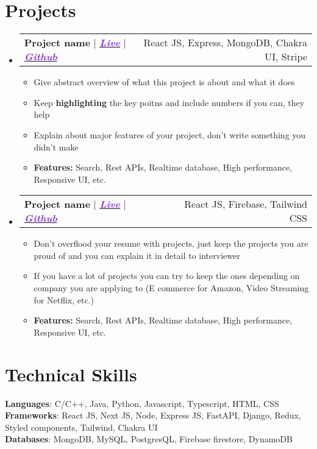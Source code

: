 \documentclass[letterpaper,11pt]{article}
\makeatletter
\newcommand{\resumeItem}[1]{
  \item\small{
    {#1 \vspace{-2pt}}
  }
}
\newcommand{\resumeProjectHeading}[2]{
    \item
    \begin{tabular*}{0.97\textwidth}{l@{\extracolsep{\fill}}r}
      \small#1 & #2 \\
    \end{tabular*}\vspace{-7pt}
}
\newcommand{\resumeSubHeadingListStart}{\begin{itemize}[leftmargin=0.15in, label={}]}
\newcommand{\resumeSubHeadingListEnd}{\end{itemize}}
\newcommand{\resumeItemListStart}{\begin{itemize}}
\newcommand{\resumeItemListEnd}{\end{itemize}\vspace{-5pt}}
\makeatother
\begin{document}
\section{Projects}
    \resumeSubHeadingListStart
      \resumeProjectHeading
          {\textbf{\large{Project name}} $|$ \emph{\href{https://google.com/}{\textcolor{BlueViolet}{\textbf{Live}}}} $|$ \emph{\href{https://github.com/}{\textcolor{BlueViolet}{\textbf{Github}}}}}{React JS, Express, MongoDB, Chakra UI, Stripe}
          \resumeItemListStart
            \resumeItem{Give abstract overview of what this project is about and what it does}
            \resumeItem{Keep \textbf{highlighting} the key poitns and include numbers if you can, they help}
            \resumeItem{Explain about major features of your project, don't write something you didn't make}
            \resumeItem{\textbf{Features:} Search, Rest APIs, Realtime database, High performance, Responsive UI, etc. }
          \resumeItemListEnd
          
    \resumeProjectHeading
          {\textbf{\large{Project name}} $|$ \emph{\href{https://google.com/}{\textcolor{BlueViolet}{\textbf{Live}}}} $|$ \emph{\href{https://github.com/}{\textcolor{BlueViolet}{\textbf{Github}}}}}{React JS, Firebase, Tailwind CSS}
          \resumeItemListStart
            \resumeItem{Don't overflood your resume with projects, just keep the projects you are proud of and you can explain it in detail to interviewer}
            \resumeItem{If you have a lot of projects you can try to keep the ones depending on company you are applying to (E commerce for Amazon, Video Streaming for Netflix, etc.)}
            \resumeItem{\textbf{Features:} Search, Rest APIs, Realtime database, High performance, Responsive UI, etc. }
          \resumeItemListEnd
          
    \resumeSubHeadingListEnd



\section{Technical Skills}
 \begin{itemize}[leftmargin=0.15in, label={}]
    \small{\item{
     \textbf{Languages}{: C/C++, Java, Python, Javascript, Typescript, HTML, CSS} \\
     \textbf{Frameworks}{: React JS, Next JS, Node, Express JS, FastAPI, Django, Redux, Styled components, Tailwind, Chakra UI} \\
     \textbf{Databases}{: MongoDB, MySQL, PostgresQL, Firebase firestore, DynamoDB} \\
    }}
 \end{itemize}
\end{document}
